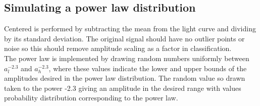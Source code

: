 
		\subsection{Simulating a power law distribution}
		Centered is performed by subtracting the mean from the light curve and dividing by its standard deviation. The original signal should have no outlier points or noise so this should remove amplitude scaling as a factor in classification. \\
		The power law is implemented by drawing random numbers uniformly between $a_{l}^{-2.3}$ and $a_{h}^{-2.3}$, where these values indicate the lower and upper bounds of the amplitudes desired in the power law distribution. The random value so drawn taken to the power -2.3 giving an amplitude in the desired range with values probability distribution corresponding to the power law. %
		
		
